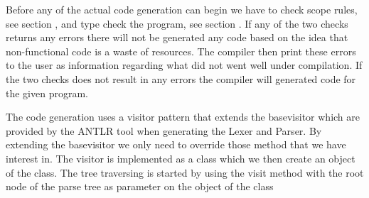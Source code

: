Before any of the actual code generation can begin we have to check scope rules, see section , and type check the program, see section . If any of the two checks returns any errors there will not be generated any code based on the idea that non-functional code is a waste of resources. The compiler then print these errors to the user as information regarding what did not went well under compilation. If the two checks does not result in any errors the compiler will generated code for the given program.

The code generation uses a visitor pattern that extends the basevisitor which are provided by the ANTLR tool when generating the Lexer and Parser. By extending the basevisitor we only need to override those method that we have interest in. The visitor is implemented as a class which we then create an object of the class. The tree traversing is started by using the visit method with the root node of the parse tree as parameter on the object of the class